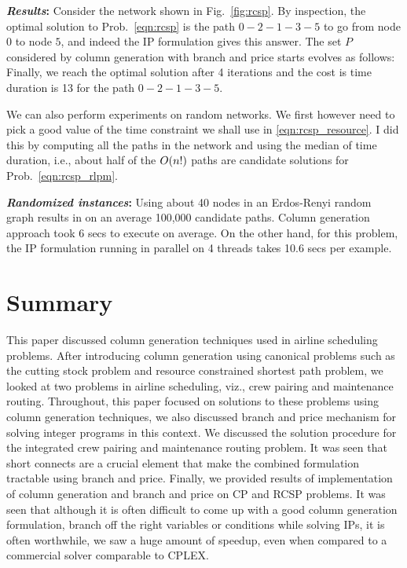 \documentclass[letterpaper, 10pt, twocolumn, reqno]{amsart}
\begin{document}
\textbf{\emph{Results}:} Consider the network shown in Fig.~\ref{fig:rcsp}. By inspection, the optimal solution to Prob.~\eqref{eqn:rcsp} is the path $0-2-1-3-5$ to go from node $0$ to node $5$, and indeed the IP formulation gives this answer. The set $P$ considered by column generation with branch and price starts evolves as follows:
Finally, we reach the optimal solution after 4 iterations and the cost is time duration is 13 for the path $0-2-1-3-5$.

We can also perform experiments on random networks. We first however need to pick a good value of the time constraint we shall use in \eqref{eqn:rcsp_resource}. I did this by computing all the paths in the network and using the median of time duration, i.e., about half of the $O(n!)$ paths are candidate solutions for Prob.~\ref{eqn:rcsp_rlpm}.

\textbf{\emph{Randomized instances}:} Using about 40 nodes in an Erdos-Renyi random graph results in on an average 100,000 candidate paths. Column generation approach took 6 secs to execute on average. On the other hand, for this problem, the IP formulation running in parallel on 4 threads takes 10.6 secs per example.


\section{Summary}
\label{sec:summary}

This paper discussed column generation techniques used in airline scheduling problems. After introducing column generation using canonical problems such as the cutting stock problem and resource constrained shortest path problem, we looked at two problems in airline scheduling, viz., crew pairing and maintenance routing. Throughout, this paper focused on solutions to these problems using column generation techniques, we also discussed branch and price mechanism for solving integer programs in this context. We discussed the solution procedure for the integrated crew pairing and maintenance routing problem. It was seen that short connects are a crucial element that make the combined formulation tractable using branch and price. Finally, we provided results of implementation of column generation and branch and price on CP and RCSP problems. It was seen that although it is often difficult to come up with a good column generation formulation, branch off the right variables or conditions while solving IPs, it is often worthwhile, we saw a huge amount of speedup, even when compared to a commercial solver comparable to CPLEX.


{
\footnotesize


}
\end{document}
